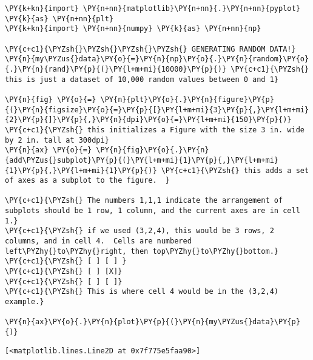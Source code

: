     \begin{tcolorbox}[breakable, size=fbox, boxrule=1pt, pad at break*=1mm,colback=cellbackground, colframe=cellborder]
\begin{Verbatim}[commandchars=\\\{\}]
\PY{k+kn}{import} \PY{n+nn}{matplotlib}\PY{n+nn}{.}\PY{n+nn}{pyplot} \PY{k}{as} \PY{n+nn}{plt}
\PY{k+kn}{import} \PY{n+nn}{numpy} \PY{k}{as} \PY{n+nn}{np}

\PY{c+c1}{\PYZsh{}\PYZsh{}\PYZsh{}\PYZsh{} GENERATING RANDOM DATA!}
\PY{n}{my\PYZus{}data}\PY{o}{=}\PY{n}{np}\PY{o}{.}\PY{n}{random}\PY{o}{.}\PY{n}{rand}\PY{p}{(}\PY{l+m+mi}{10000}\PY{p}{)} \PY{c+c1}{\PYZsh{} this is just a dataset of 10,000 random values between 0 and 1}

\PY{n}{fig} \PY{o}{=} \PY{n}{plt}\PY{o}{.}\PY{n}{figure}\PY{p}{(}\PY{n}{figsize}\PY{o}{=}\PY{p}{[}\PY{l+m+mi}{3}\PY{p}{,}\PY{l+m+mi}{2}\PY{p}{]}\PY{p}{,}\PY{n}{dpi}\PY{o}{=}\PY{l+m+mi}{150}\PY{p}{)} \PY{c+c1}{\PYZsh{} this initializes a Figure with the size 3 in. wide by 2 in. tall at 300dpi}
\PY{n}{ax} \PY{o}{=} \PY{n}{fig}\PY{o}{.}\PY{n}{add\PYZus{}subplot}\PY{p}{(}\PY{l+m+mi}{1}\PY{p}{,}\PY{l+m+mi}{1}\PY{p}{,}\PY{l+m+mi}{1}\PY{p}{)} \PY{c+c1}{\PYZsh{} this adds a set of axes as a subplot to the figure.  }

\PY{c+c1}{\PYZsh{} The numbers 1,1,1 indicate the arrangement of subplots should be 1 row, 1 column, and the current axes are in cell 1.}
\PY{c+c1}{\PYZsh{} if we used (3,2,4), this would be 3 rows, 2 columns, and in cell 4.  Cells are numbered left\PYZhy{}to\PYZhy{}right, then top\PYZhy{}to\PYZhy{}bottom.}
\PY{c+c1}{\PYZsh{} [ ] [ ] }
\PY{c+c1}{\PYZsh{} [ ] [X]}
\PY{c+c1}{\PYZsh{} [ ] [ ]}
\PY{c+c1}{\PYZsh{} This is where cell 4 would be in the (3,2,4) example.}

\PY{n}{ax}\PY{o}{.}\PY{n}{plot}\PY{p}{(}\PY{n}{my\PYZus{}data}\PY{p}{)}
\end{Verbatim}
\end{tcolorbox}

            \begin{tcolorbox}[breakable, size=fbox, boxrule=.5pt, pad at break*=1mm, opacityfill=0]
\begin{Verbatim}[commandchars=\\\{\}]
[<matplotlib.lines.Line2D at 0x7f775e5faa90>]
\end{Verbatim}
\end{tcolorbox}
        
